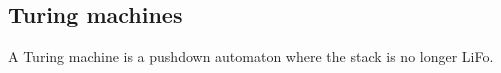 \subsection{Turing machines}

A Turing machine is a pushdown automaton where the stack is no longer LiFo.

